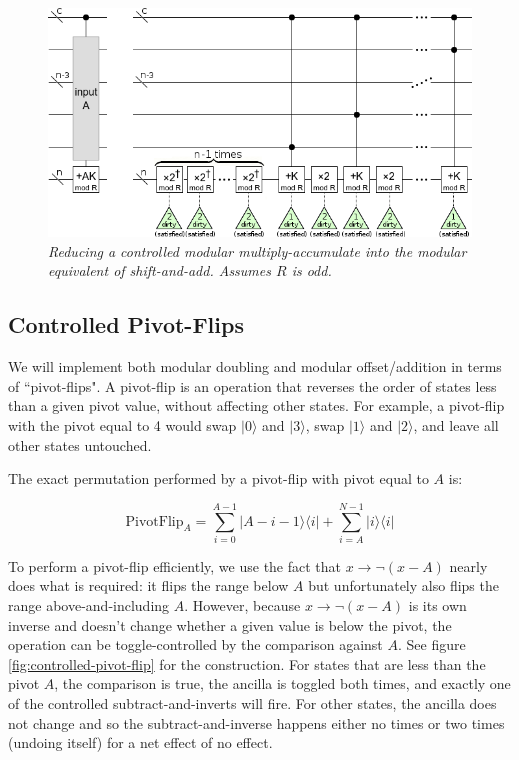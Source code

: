\documentclass[twocolumn]{article}
\begin{document}
\begin{figure}
  \centering
  \includegraphics[width=\linewidth]{assets/controlled-modular-multiply-accumulate.png}
  \caption{\em
    Reducing a controlled modular multiply-accumulate into the modular equivalent of shift-and-add.
    Assumes $R$ is odd.
  }
  \label{fig:controlled-modular-multiply-accumulate}
\end{figure}

\subsection{Controlled Pivot-Flips}

We will implement both modular doubling and modular offset/addition in terms of ``pivot-flips".
A pivot-flip is an operation that reverses the order of states less than a given pivot value, without affecting other states.
For example, a pivot-flip with the pivot equal to 4 would swap $|0\rangle$ and $|3\rangle$, swap $|1\rangle$ and $|2\rangle$, and leave all other states untouched.

The exact permutation performed by a pivot-flip with pivot equal to $A$ is:

$$\text{PivotFlip}_A = \sum_{i=0}^{A-1} |A-i-1\rangle \langle i| + \sum_{i=A}^{N-1} |i\rangle \langle i|$$

To perform a pivot-flip efficiently, we use the fact that $x \rightarrow \lnot(x - A)$ nearly does what is required: it flips the range below $A$ but unfortunately also flips the range above-and-including $A$.
However, because $x \rightarrow \lnot(x - A)$ is its own inverse and doesn't change whether a given value is below the pivot, the operation can be toggle-controlled by the comparison against $A$.
See figure \ref{fig:controlled-pivot-flip} for the construction.
For states that are less than the pivot $A$, the comparison is true, the ancilla is toggled both times, and exactly one of the controlled subtract-and-inverts will fire.
For other states, the ancilla does not change and so the subtract-and-inverse happens either no times or two times (undoing itself) for a net effect of no effect.
\end{document}
